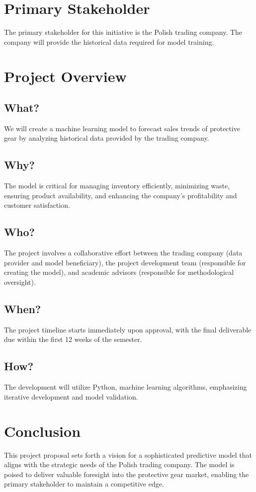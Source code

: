 \documentclass{article}
\begin{document}
\section{Primary Stakeholder}

The primary stakeholder for this initiative is the Polish trading company. The company will provide the historical data required for model training.

\section{Project Overview}

\subsection{What?}
We will create a machine learning model to forecast sales trends of protective gear by analyzing historical data provided by the trading company.

\subsection{Why?}
The model is critical for managing inventory efficiently, minimizing waste, ensuring product availability, and enhancing the company's profitability and customer satisfaction.

\subsection{Who?}
The project involves a collaborative effort between the trading company (data provider and model beneficiary), the project development team (responsible for creating the model), and academic advisors (responsible for methodological oversight).

\subsection{When?}
The project timeline starts immediately upon approval, with the final deliverable due within the first 12 weeks of the semester.

\subsection{How?}
The development will utilize Python, machine learning algorithms, emphasizing iterative development and model validation.

\section{Conclusion}

This project proposal sets forth a vision for a sophisticated predictive model that aligns with the strategic needs of the Polish trading company. The model is poised to deliver valuable foresight into the protective gear market, enabling the primary stakeholder to maintain a competitive edge.






    
\end{document}
